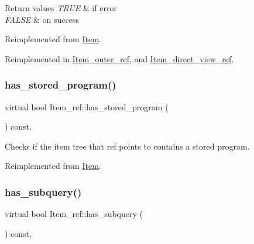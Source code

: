 \begin{DoxyRetVals}{Return values}
{\em T\+R\+UE} & if error \\
\hline
{\em F\+A\+L\+SE} & on success \\
\hline
\end{DoxyRetVals}


Reimplemented from \mbox{\hyperlink{classItem}{Item}}.



Reimplemented in \mbox{\hyperlink{classItem__outer__ref_afa87a075b4924dc80749a8e02605d196}{Item\+\_\+outer\+\_\+ref}}, and \mbox{\hyperlink{classItem__direct__view__ref_acb21497e89521376904d0cfa9a8b9340}{Item\+\_\+direct\+\_\+view\+\_\+ref}}.

\mbox{\label{classItem__ref_adaa4af3fdac66a5ca6979fb7cd0dd256}} 
\subsubsection{\texorpdfstring{has\+\_\+stored\+\_\+program()}{has\_stored\_program()}}
{\footnotesize\ttfamily virtual bool Item\+\_\+ref\+::has\+\_\+stored\+\_\+program (\begin{DoxyParamCaption}{ }\end{DoxyParamCaption}) const\hspace{0.3cm}{\ttfamily [inline]}, {\ttfamily [virtual]}}

Checks if the item tree that ref points to contains a stored program. 

Reimplemented from \mbox{\hyperlink{classItem}{Item}}.

\mbox{\label{classItem__ref_a3d3e749004c6da772dab1aec83066aa0}} 
\subsubsection{\texorpdfstring{has\+\_\+subquery()}{has\_subquery()}}
{\footnotesize\ttfamily virtual bool Item\+\_\+ref\+::has\+\_\+subquery (\begin{DoxyParamCaption}{ }\end{DoxyParamCaption}) const\hspace{0.3cm}{\ttfamily [inline]}, {\ttfamily [virtual]}}

